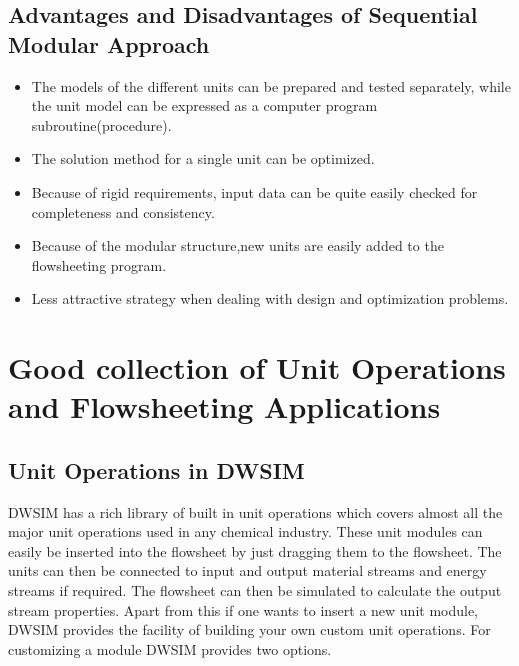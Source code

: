 \documentclass[12pt]{report}
\begin{document}
\subsection{Advantages and Disadvantages of Sequential Modular Approach}

\begin{itemize}
\item {The models of the different units can be prepared and tested separately, while the unit model can be expressed as a computer program subroutine(procedure).}
\item{The solution method for a single unit can be optimized.}
\item{Because of rigid requirements, input data can be quite easily checked for completeness and consistency.}
\item{Because of the modular structure,new units are easily added to the flowsheeting program.}
\item{Less attractive strategy when dealing with design and optimization problems.}
\end{itemize}

\section{Good collection of Unit Operations and Flowsheeting Applications}

\subsection{Unit Operations in DWSIM}

DWSIM has a rich library of built in unit operations which covers almost all the major unit operations used in any chemical industry. These unit modules can easily be inserted into the flowsheet by just dragging them to the flowsheet. The units can then be connected to input and output material streams and energy streams if required. The flowsheet can then be simulated to calculate the output stream properties.
Apart from this if one wants to insert a new unit module, DWSIM provides the facility of building your own custom unit operations. For customizing a module DWSIM provides two options.
\end{document}
